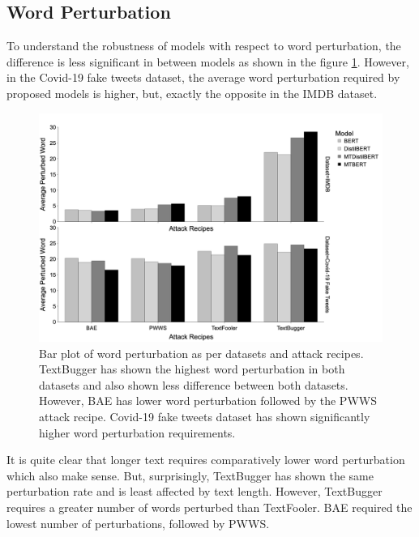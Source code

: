 \documentclass[%
	BCOR=8mm, %
	DIV=12,
	toc=bibliography, %
	toc=listof, %
	oneside, %
	egregdoesnotlikesansseriftitles, %
	]{scrbook}
\begin{document}
\subsection{Word Perturbation}
To understand the robustness of models with respect to word perturbation, the difference is less significant in between models as shown in the figure \ref{fig:avgpertbyattackrecipes}. However, in the Covid-19 fake tweets dataset, the average word perturbation required by proposed models is higher, but, exactly the opposite in the IMDB dataset.
\begin{figure}[H]
    \centering
     \hspace*{2.5em}
    \includegraphics[width=0.9\linewidth]{img/AvgPertByDataset}
    \caption[Bar plot of word perturbation rate]{Bar plot of word perturbation as per datasets and attack recipes. TextBugger has shown the highest word perturbation in both datasets and also shown less difference between both datasets. However, BAE has lower word perturbation followed by the PWWS attack recipe. Covid-19 fake tweets dataset has shown significantly higher word perturbation requirements.  }
    \label{fig:avgpertbyattackrecipes}
\end{figure}
 It is quite clear that longer text requires comparatively lower word perturbation which also make sense. But, surprisingly, TextBugger has shown the same perturbation rate and is least affected by text length. However,  TextBugger requires a greater number of words perturbed than TextFooler. BAE required the lowest number of perturbations, followed by PWWS.
\end{document}

